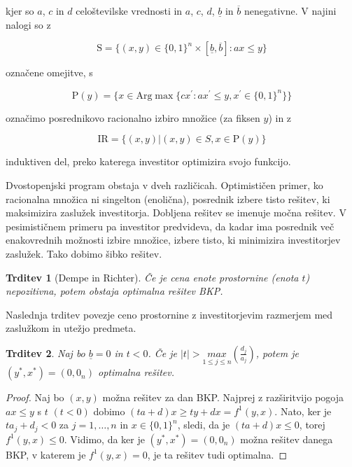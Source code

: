 \documentclass[a4paper, 11pt]{article}
\newtheorem{theorem}{Trditev}
\begin{document}
	
kjer so $a$, $c$ in $d$ celoštevilske vrednosti in $a$, $c$, $d$, $\underline{b}$ in $\overline{b}$ nenegativne. V najini nalogi so z
	
	$$ \text{S} = \{ (x, y) \in \{ 0, 1 \}^n \times \left[ \underline{b}, \overline{b} \right]: ax \leq y\} $$ 
	
	označene omejitve, s 
	
	$$ \text{P}(y) = \{ x \in \text{Arg}\max \{ cx^\prime: ax^\prime \leq y, x^\prime \in \{ 0,1\}^n \} \}$$
	
	označimo posrednikovo racionalno izbiro množice (za fiksen $y$) in z 
	
	$$ \text{IR} = \{ (x,y)  | (x,y) \in S, x \in \text{P}(y) \} $$
	
	induktiven del, preko katerega investitor optimizira svojo funkcijo.
	
	Dvostopenjski program obstaja v dveh različicah. Optimističen primer, ko racionalna množica ni singelton (enolična), posrednik izbere tisto rešitev, ki maksimizira zaslužek investitorja. Dobljena rešitev se imenuje močna rešitev. V pesimističnem primeru pa investitor predvideva, da kadar ima posrednik več enakovrednih možnosti izbire množice, izbere tisto, ki minimizira investitorjev zaslužek. Tako dobimo šibko rešitev.
	
	\begin{theorem}[Dempe in Richter]
	Če je cena enote prostornine (enota $t$) nepozitivna, potem obstaja optimalna rešitev BKP.
	\label{trditev1}
	\end{theorem}
	
	Naslednja trditev povezje ceno prostornine z investitorjevim razmerjem med zaslužkom in utežjo predmeta.
	
	\begin{theorem}
	Naj bo $\underline{b} = 0$ in $t < 0$. Če je  $| t | > \underset{1 \leq j \leq n}{max}(\frac{d_j}{a_j})$,  potem je $(y^*, x^*) = (0, 0_n)$ optimalna rešitev.
	\end{theorem}
	
	\begin{proof}
	Naj bo $(x, y)$ možna rešitev za dan BKP. Najprej z razširitvijo pogoja $ ax \leq y$ s $t$ $(t < 0)$ dobimo $(ta + d)x \geq ty + dx = f^{1}(y,x)$. Nato, ker je $ta_j + d_j < 0$ za $j = 1, \dots , n$ in $ x \in \{0, 1 \}^n$, sledi, da je $(ta + d)x \leq 0$, torej $f^{1}(y,x) \leq 0$. Vidimo, da ker je $(y^*, x^*) = (0, 0_n)$ možna rešitev danega BKP, v katerem je $f^{1}(y,x) = 0$, je ta rešitev tudi optimalna.
	\end{proof}
	
\end{document}
